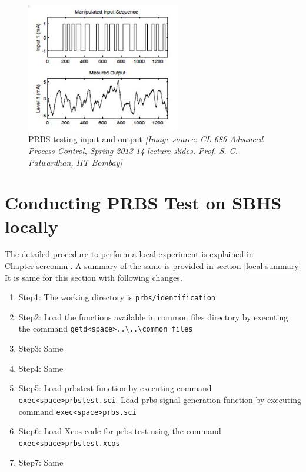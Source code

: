 \begin{figure}[H]
\begin{centering}
\includegraphics[width=0.6\textwidth]{prbs/PRBS}
\par\end{centering}

\caption{PRBS testing input and output \textit{{[}Image source: CL 686 Advanced
Process Control, Spring 2013-14 lecture slides. Prof. S. C. Patwardhan, IIT Bombay{]}}}
\label{sample-prbs}
\end{figure}

\section{Conducting PRBS Test on SBHS locally}
The detailed procedure to perform a local experiment is explained in Chapter\ref{sercomm}. A summary of the same is provided in section \ref{local-summary} It is same for this section with following changes.

\begin{enumerate}
\item Step1: The working directory is {\tt  prbs/identification}
\item Step2:  Load the functions available in common files directory by executing the command {\tt getd<space>..\textbackslash ..\textbackslash common\_files\ }
\item Step3: Same
\item Step4: Same
\item Step5: Load prbstest function by executing command\\ {\tt exec<space>prbstest.sci}. Load prbs signal generation function by executing command {\tt exec<space>prbs.sci}
\item Step6: Load Xcos code for prbs test using the command\\ {\tt exec<space>prbstest.xcos}
\item Step7: Same
\end{enumerate}


